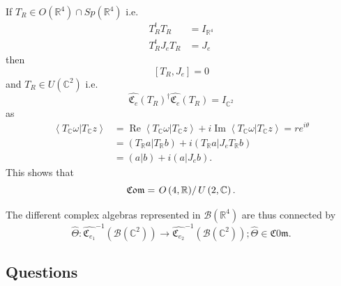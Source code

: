 \documentclass[aps,preprint]{revtex4}%
\begin{document}
If $T_{R}\in O\left(  \mathbb{R}^{4}\right)  \cap Sp\left(  \mathbb{R}%
^{4}\right)  $ i.e.
\begin{align}
T_{R}^{t}T_{R}  &  =I_{\mathbb{R}^{4}}\\
T_{R}^{t}J_{e}T_{R}  &  =J_{e}%
\end{align}
then
\begin{equation}
\left[  T_{R},J_{e}\right]  =0
\end{equation}
and $T_{R}\in U\left(  \mathbb{C}^{2}\right)  $ i.e.
\begin{equation}
\widehat{\mathfrak{C}_{e}}\left(  T_{R}\right)  ^{\dagger}%
\widehat{\mathfrak{C}_{e}}\left(  T_{R}\right)  =I_{\mathbb{C}^{2}}%
\end{equation}
as
\begin{align}
\left\langle \left.  T_{\mathbb{C}}\omega\right\vert T_{\mathbb{C}%
}z\right\rangle  &  =\operatorname{Re}\left\langle \left.  T_{\mathbb{C}%
}\omega\right\vert T_{\mathbb{C}}z\right\rangle +i\operatorname{Im}%
\left\langle \left.  T_{\mathbb{C}}\omega\right\vert T_{\mathbb{C}%
}z\right\rangle =re^{i\theta}\\
&  =\left(  \left.  T_{\mathbb{R}}a\right\vert T_{\mathbb{R}}b\right)
+i\left(  \left.  T_{\mathbb{R}}a\right\vert J_{e}T_{\mathbb{R}}b\right) \\
&  =\left(  \left.  a\right\vert b\right)  +i\left(  \left.  a\right\vert
J_{e}b\right)  .
\end{align}
This shows that
\begin{equation}
\mathfrak{C0m}=\left.  O\left(  4,\mathbb{R}\right)  \right/  U\left(
2,\mathbb{C}\right)  .
\end{equation}


The different complex algebras represented in $\mathcal{B}\left(
\mathbb{R}^{4}\right)  $ are thus connected by
\begin{equation}
\widehat{\Theta}:\widehat{\mathfrak{C}_{e_{1}}}^{-1}\left(  \mathcal{B}\left(
\mathbb{C}^{2}\right)  \right)  \rightarrow\widehat{\mathfrak{C}_{e_{2}}}%
^{-1}\left(  \mathcal{B}\left(  \mathbb{C}^{2}\right)  \right)
;\widehat{\Theta}\in\mathfrak{C0m.}%
\end{equation}


\subsection{Questions}
\end{document}
